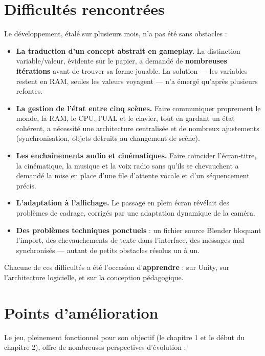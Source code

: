 \documentclass[12pt,a4paper]{article}
\begin{document}
\section{Difficultés rencontrées}

Le développement, étalé sur plusieurs mois, n'a pas été sans obstacles :

\begin{itemize}[leftmargin=1.4em]
  \item \textbf{La traduction d'un concept abstrait en gameplay.} La distinction
  variable/valeur, évidente sur le papier, a demandé de \textbf{nombreuses
  itérations} avant de trouver sa forme jouable. La solution — les variables
  restent en RAM, seules les valeurs voyagent — n'a émergé qu'après plusieurs
  refontes.
  \item \textbf{La gestion de l'état entre cinq scènes.} Faire communiquer
  proprement le monde, la RAM, le CPU, l'UAL et le clavier, tout en gardant un
  état cohérent, a nécessité une architecture centralisée et de nombreux
  ajustements (synchronisation, objets détruits au changement de scène).
  \item \textbf{Les enchaînements audio et cinématiques.} Faire coïncider
  l'écran-titre, la cinématique, la musique et la voix radio sans qu'ils se
  chevauchent a demandé la mise en place d'une file d'attente vocale et d'un
  séquencement précis.
  \item \textbf{L'adaptation à l'affichage.} Le passage en plein écran révélait
  des problèmes de cadrage, corrigés par une adaptation dynamique de la caméra.
  \item \textbf{Des problèmes techniques ponctuels} : un fichier source Blender
  bloquant l'import, des chevauchements de texte dans l'interface, des messages
  mal synchronisés — autant de petits obstacles résolus un à un.
\end{itemize}

Chacune de ces difficultés a été l'occasion d'\textbf{apprendre} : sur Unity, sur
l'architecture logicielle, et sur la conception pédagogique.

\section{Points d'amélioration}

Le jeu, pleinement fonctionnel pour son objectif (le chapitre 1 et le début du
chapitre 2), offre de nombreuses perspectives d'évolution :
\end{document}
